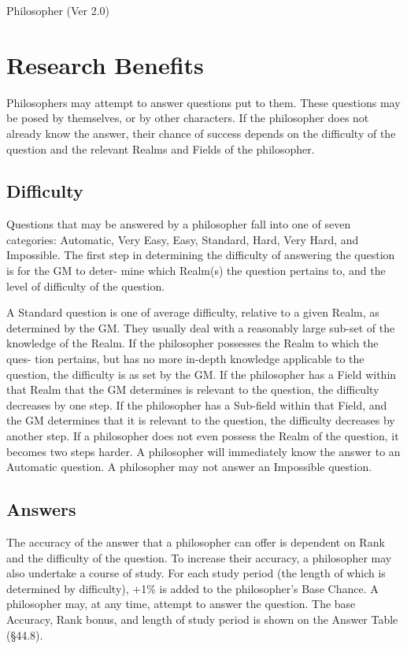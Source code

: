 \begin{Chapter}{Philosopher (Ver 2.0)}
\section{Research Benefits}

Philosophers may attempt to answer questions put to them.  These
questions may be posed by themselves, or by other characters.  If the
philosopher does not already know the answer, their chance of success
depends on the difficulty of the question and the relevant Realms and
Fields of the philosopher.

\subsection{Difficulty}

Questions that may be answered by a philosopher fall into one of seven
categories: Automatic, Very Easy, Easy, Standard, Hard, Very Hard, and
Impossible.  The first step in determining the difficulty of answering
the question is for the GM to deter- mine which Realm(s) the question
pertains to, and the level of difficulty of the question.

A Standard question is one of average difficulty, relative to a given
Realm, as determined by the GM.  They usually deal with a reasonably
large sub-set of the knowledge of the Realm.  If the philosopher
possesses the Realm to which the ques- tion pertains, but has no more
in-depth knowledge applicable to the question, the difficulty is as
set by the GM.  If the philosopher has a Field within that Realm that
the GM determines is relevant to the question, the difficulty
decreases by one step.  If the philosopher has a Sub-field within that
Field, and the GM determines that it is relevant to the question, the
difficulty decreases by another step.  If a philosopher does not even
possess the Realm of the question, it becomes two steps harder.  A
philosopher will immediately know the answer to an Automatic
question. A philosopher may not answer an Impossible question.

\subsection{Answers}

The accuracy of the answer that a philosopher can offer is dependent
on Rank and the difficulty of the question. To increase their
accuracy, a philosopher may also undertake a course of study.  For
each study period (the length of which is determined by difficulty),
+1\% is added to the philosopher’s Base Chance. A philosopher may, at
any time, attempt to answer the question.  The base Accuracy, Rank
bonus, and length of study period is shown on the Answer Table
(§44.8).


\end{Chapter}
